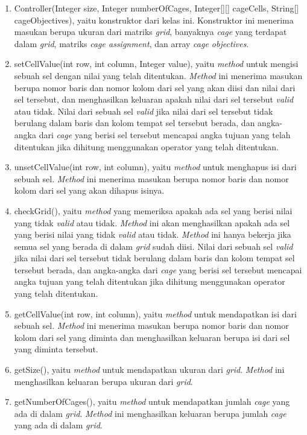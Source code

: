 \begin{enumerate}
\item Controller(Integer size, Integer numberOfCages, Integer[][] cageCells, String[] cageObjectives), yaitu konstruktor dari kelas ini. Konstruktor ini menerima masukan berupa ukuran dari matriks \textit{grid}, banyaknya \textit{cage} yang terdapat dalam \textit{grid}, matriks \textit{cage assignment}, dan array \textit{cage objectives}.
\item setCellValue(int row, int column, Integer value), yaitu \textit{method} untuk mengisi sebuah sel dengan nilai yang telah ditentukan. \textit{Method} ini menerima masukan berupa nomor baris dan nomor kolom dari sel yang akan diisi dan nilai dari sel tersebut, dan menghasilkan keluaran apakah nilai dari sel tersebut \textit{valid} atau tidak. Nilai dari sebuah sel \textit{valid} jika nilai dari sel tersebut tidak berulang dalam baris dan kolom tempat sel tersebut berada, dan angka-angka dari \textit{cage} yang berisi sel tersebut mencapai angka tujuan yang telah ditentukan jika dihitung menggunakan operator yang telah ditentukan.
\item unsetCellValue(int row, int column), yaitu \textit{method} untuk menghapus isi dari sebuah sel. \textit{Method} ini menerima masukan berupa nomor baris dan nomor kolom dari sel yang akan dihapus isinya.
\item checkGrid(), yaitu \textit{method} yang memeriksa apakah ada sel yang berisi nilai yang tidak \textit{valid} atau tidak. \textit{Method} ini akan menghasilkan apakah ada sel yang berisi nilai yang tidak \textit{valid} atau tidak. \textit{Method} ini hanya bekerja jika semua sel yang berada di dalam \textit{grid} sudah diisi. Nilai dari sebuah sel \textit{valid} jika nilai dari sel tersebut tidak berulang dalam baris dan kolom tempat sel tersebut berada, dan angka-angka dari \textit{cage} yang berisi sel tersebut mencapai angka tujuan yang telah ditentukan jika dihitung menggunakan operator yang telah ditentukan.
\item getCellValue(int row, int column), yaitu \textit{method} untuk mendapatkan isi dari sebuah sel. \textit{Method} ini menerima masukan berupa nomor baris dan nomor kolom dari sel yang diminta dan menghasilkan keluaran berupa isi dari sel yang diminta tersebut.
\item getSize(), yaitu \textit{method} untuk mendapatkan ukuran dari \textit{grid}. \textit{Method} ini menghasilkan keluaran berupa ukuran dari \textit{grid}.
\item getNumberOfCages(), yaitu \textit{method} untuk mendapatkan jumlah \textit{cage} yang ada di dalam \textit{grid}. \textit{Method} ini menghasilkan keluaran berupa jumlah \textit{cage} yang ada di dalam \textit{grid}.

\end{enumerate}
